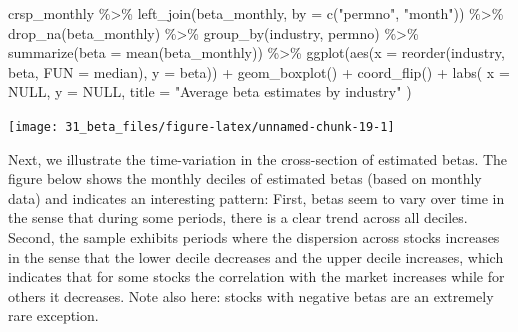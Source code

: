 \documentclass[
]{krantz}
\newenvironment{Shaded}{\begin{snugshade}}{\end{snugshade}}
\newcommand{\AttributeTok}[1]{\textcolor[rgb]{0.61,0.61,0.61}{#1}}
\newcommand{\ConstantTok}[1]{\textcolor[rgb]{0,0,0}{#1}}
\newcommand{\FunctionTok}[1]{\textcolor[rgb]{0,0,0}{#1}}
\newcommand{\NormalTok}[1]{#1}
\newcommand{\SpecialCharTok}[1]{\textcolor[rgb]{0,0,0}{#1}}
\newcommand{\StringTok}[1]{\textcolor[rgb]{0.5,0.5,0.5}{#1}}
\begin{document}
\begin{Shaded}
\begin{Highlighting}[]
\NormalTok{crsp\_monthly }\SpecialCharTok{\%\textgreater{}\%}
  \FunctionTok{left\_join}\NormalTok{(beta\_monthly, }\AttributeTok{by =} \FunctionTok{c}\NormalTok{(}\StringTok{"permno"}\NormalTok{, }\StringTok{"month"}\NormalTok{)) }\SpecialCharTok{\%\textgreater{}\%}
  \FunctionTok{drop\_na}\NormalTok{(beta\_monthly) }\SpecialCharTok{\%\textgreater{}\%}
  \FunctionTok{group\_by}\NormalTok{(industry, permno) }\SpecialCharTok{\%\textgreater{}\%}
  \FunctionTok{summarize}\NormalTok{(}\AttributeTok{beta =} \FunctionTok{mean}\NormalTok{(beta\_monthly)) }\SpecialCharTok{\%\textgreater{}\%}
  \FunctionTok{ggplot}\NormalTok{(}\FunctionTok{aes}\NormalTok{(}\AttributeTok{x =} \FunctionTok{reorder}\NormalTok{(industry, beta, }\AttributeTok{FUN =}\NormalTok{ median), }\AttributeTok{y =}\NormalTok{ beta)) }\SpecialCharTok{+}
  \FunctionTok{geom\_boxplot}\NormalTok{() }\SpecialCharTok{+}
  \FunctionTok{coord\_flip}\NormalTok{() }\SpecialCharTok{+}
  \FunctionTok{labs}\NormalTok{(}
    \AttributeTok{x =} \ConstantTok{NULL}\NormalTok{, }\AttributeTok{y =} \ConstantTok{NULL}\NormalTok{,}
    \AttributeTok{title =} \StringTok{"Average beta estimates by industry"}
\NormalTok{  )}
\end{Highlighting}
\end{Shaded}

\begin{center}\texttt{[image: 31\_beta\_files/figure-latex/unnamed-chunk-19-1]} \end{center}

Next, we illustrate the time-variation in the cross-section of estimated betas. The figure below shows the monthly deciles of estimated betas (based on monthly data) and indicates an interesting pattern: First, betas seem to vary over time in the sense that during some periods, there is a clear trend across all deciles. Second, the sample exhibits periods where the dispersion across stocks increases in the sense that the lower decile decreases and the upper decile increases, which indicates that for some stocks the correlation with the market increases while for others it decreases. Note also here: stocks with negative betas are an extremely rare exception.
\end{document}
